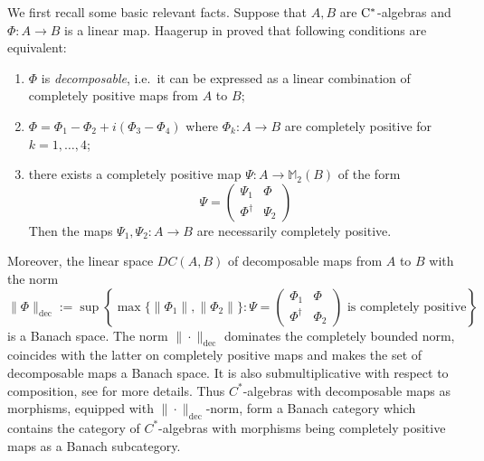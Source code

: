 \documentclass[11 pt, leqno]{amsart}
\numberwithin{equation}{section}
\theoremstyle{plain}
\newtheorem {prop}[thm] {Proposition}
\theoremstyle{definition}
\newcommand{\Mat}{\mathbb M} %
\newcommand{\cst}{\ifmmode\mathrm{C}^*\else{$\mathrm{C}^*$}\fi}
\begin{document}
We first recall some basic relevant facts. 
Suppose that $A,B$ are $\cst$-algebras and $\Phi : A \to B$ is a linear map.
Haagerup in \cite{Haagerupdec} proved that following conditions are equivalent:
\begin{enumerate}
    \item\label{enu:Haagerupdec1} $\Phi$ is \emph{decomposable}, i.e.\ it can be expressed as a linear combination of completely positive maps from $A$ to $B$;
    \item\label{enu:Haagerupdec2} $\Phi = \Phi_1 - \Phi_2 + i (\Phi_3 - \Phi_4)$ where $\Phi_k : A \to B$ are completely positive for $k=1,\ldots ,4$;
    \item\label{enu:Haagerupdec3} there exists a completely positive map $\Psi : A \to \Mat_2(B)$ of the form
    \[
        \Psi = \begin{pmatrix}\Psi_1 & \Phi \\ 
                    \Phi ^\dagger & \Psi_2 
                \end{pmatrix} 
    \]
Then the maps $\Psi_1,\Psi_2:A \to B$ are necessarily completely positive.
\end{enumerate}
Moreover, the linear space $DC(A,B)$ of decomposable maps from $A$ to $B$ with the norm
\[
    \| \Phi \|_{\mathrm{dec}} := \sup \left\{ \max\{ \|\Phi_1\|, \|\Phi_2\|\}: \Psi = \begin{pmatrix}\Phi_1 & \Phi \\\Phi ^\dagger & \Phi_2 \end{pmatrix} \text{ is completely positive} \right\}
\]
is a Banach space. 
The norm $\| \cdot \|_{\mathrm{dec}}$ dominates the completely bounded norm, coincides with the latter on completely positive maps and makes the set of decomposable maps a Banach space. 
It is also submultiplicative with respect to composition, see \cite{Haagerupdec} for more details.
Thus $C^*$-algebras with decomposable maps as morphisms, equipped with $\|\cdot \|_{\mathrm{dec}}$-norm,  form a Banach category which contains the category of $C^*$-algebras with morphisms being completely positive maps as a Banach subcategory.
\end{document}

